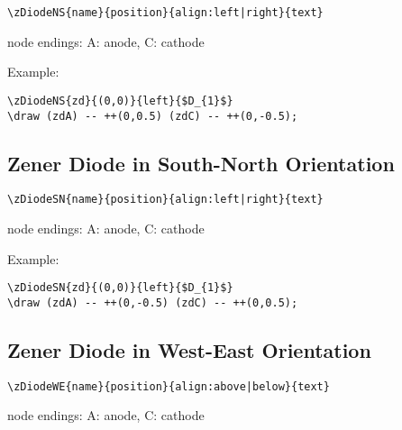 \documentclass[parskip=full]{scrartcl}
\begin{document}
\begin{verbatim}
\zDiodeNS{name}{position}{align:left|right}{text}
\end{verbatim}
node endings: A: anode, C: cathode

Example:\\
\begin{minipage}{0.8\textwidth}
\begin{verbatim}
\zDiodeNS{zd}{(0,0)}{left}{$D_{1}$}
\draw (zdA) -- ++(0,0.5) (zdC) -- ++(0,-0.5);
\end{verbatim}
\end{minipage}
\begin{minipage}{0.19\textwidth}
\end{minipage}

\subsection{Zener Diode in South-North Orientation}

\begin{verbatim}
\zDiodeSN{name}{position}{align:left|right}{text}
\end{verbatim}
node endings: A: anode, C: cathode

Example:\\
\begin{minipage}{0.8\textwidth}
\begin{verbatim}
\zDiodeSN{zd}{(0,0)}{left}{$D_{1}$}
\draw (zdA) -- ++(0,-0.5) (zdC) -- ++(0,0.5);
\end{verbatim}
\end{minipage}
\begin{minipage}{0.19\textwidth}
\end{minipage}

\subsection{Zener Diode in West-East Orientation}

\begin{verbatim}
\zDiodeWE{name}{position}{align:above|below}{text}
\end{verbatim}
node endings: A: anode, C: cathode
\end{document}
